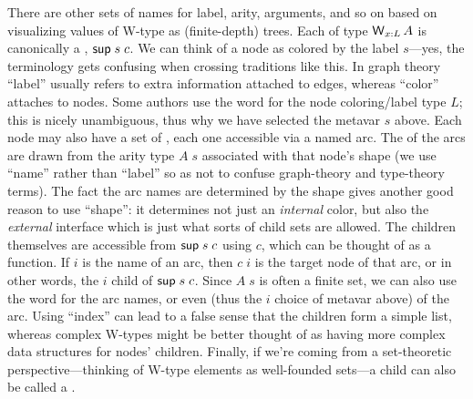 \documentclass[11pt]{article} %
\theoremstyle{definition}
\theoremstyle{remark}
\begin{document}
There are other sets of names for label, arity, arguments, and so on based on visualizing values of W-type as (finite-depth) trees.
Each  of type $\operatorname{\mathsf{W}}_{x:L}A$ is canonically a , $\mathsf{sup}\;s\;c$.
We can think of a node as colored by the label $s$---yes, the terminology gets confusing when crossing traditions like this.
In graph theory ``label'' usually refers to extra information attached to edges, whereas ``color'' attaches to nodes.
Some authors use the word  for the node coloring/label type $L$; this is nicely unambiguous, thus why we have selected the metavar $s$ above.
Each node may also have a set of , each one accessible via a named arc.
The  of the arcs are drawn from the arity type $A\;s$ associated with that node's shape (we use ``name'' rather than ``label'' so as not to confuse graph-theory and type-theory terms).
The fact the arc names are determined by the shape gives another good reason to use ``shape'': it determines not just an \emph{internal} color, but also the \emph{external} interface which is just what sorts of child sets are allowed.
The children themselves are accessible from $\mathsf{sup}\;s\;c$ using $c$, which can be thought of as a  function.
If $i$ is the name of an arc, then $c\;i$ is the target node of that arc, or in other words, the $i$\supth{} child of $\mathsf{sup}\;s\;c$.
Since $A\;s$ is often a finite set, we can also use the word  for the arc names, or even  (thus the $i$ choice of metavar above) of the arc.
Using ``index'' can lead to a false sense that the children form a simple list, whereas complex W-types might be better thought of as having more complex data structures for nodes' children.
Finally, if we're coming from a set-theoretic perspective---thinking of W-type elements as well-founded sets---a child can also be called a .
\end{document}
